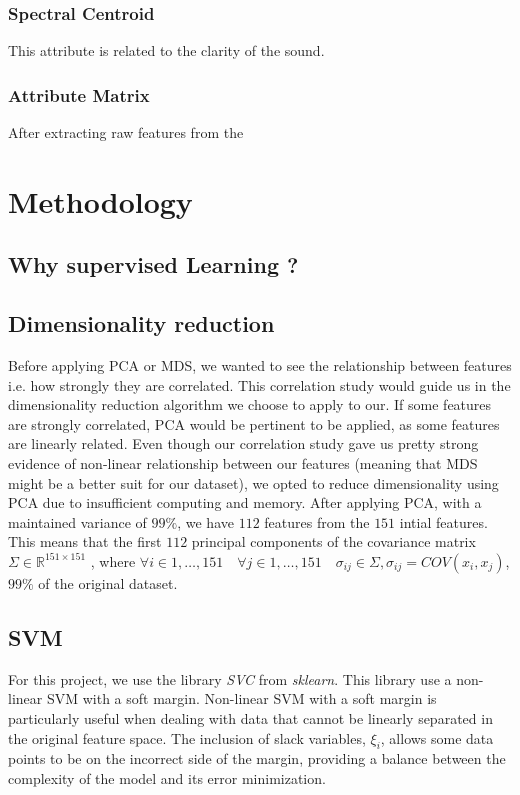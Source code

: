 \documentclass[11pt]{article}
\begin{document}
\subsubsection{Spectral Centroid}
This attribute is related to the clarity of the sound.

\subsubsection{Attribute Matrix}
After extracting raw features from the 
\section{Methodology}
\subsection{Why supervised Learning ?}

\subsection{Dimensionality reduction}
Before applying PCA or MDS, we wanted to see the relationship between features i.e. how strongly they are correlated. This correlation study would guide us in the dimensionality reduction algorithm we choose to apply to our. If some features are strongly correlated, PCA would be pertinent to be applied, as some features are linearly related. Even though our correlation study gave us pretty strong evidence of non-linear relationship between our features (meaning that MDS might be a better suit for our dataset), we opted to reduce dimensionality using PCA due to insufficient computing and memory. After applying PCA, with a maintained variance of $99\%$, we have $112$ features from the $151$ intial features. This means that the first $112$ principal components of the covariance matrix $\Sigma \in \mathbb{R}^{151 \times 151}$ , where $\forall i \in 1, \ldots, 151 \quad \forall j \in 1, \ldots, 151 \quad \sigma_{ij} \in \Sigma, \sigma_{ij} = COV(x_i, x_j)$, $99\%$ of the original dataset.

\subsection{SVM}
For this project, we use the library \textit{SVC} from \textit{sklearn}. This library use a non-linear SVM with a soft margin. Non-linear SVM with a soft margin is particularly useful when dealing with data that cannot be linearly separated in the original feature space. The inclusion of slack variables, \(\xi_i\), allows some data points to be on the incorrect side of the margin, providing a balance between the complexity of the model and its error minimization.\\
\end{document}
